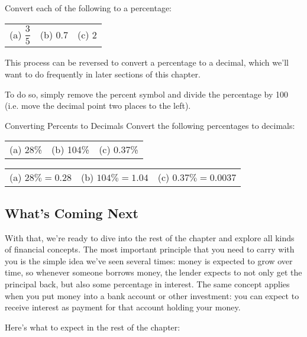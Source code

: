 \begin{try}
Convert each of the following to a percentage:\\

\begin{tabular}{l l l}
(a) $\dfrac{3}{5}$ & (b) $0.7$ & (c) 2
\end{tabular}
\end{try}

This process can be reversed to convert a percentage to a decimal, which we'll want to do frequently in later sections of this chapter.

To do so, simply remove the percent symbol and divide the percentage by 100 (i.e. move the decimal point two places to the left).

\begin{example}[https://www.youtube.com/watch?v=d770dB9RHIc&list=PLfmpjsIzhztsZtnb7HnXrQ8SLoiOCIcAM&index=2]{Converting Percents to Decimals}
Convert the following percentages to decimals:\\

\begin{tabular}{l l l}
(a) 28\% & (b) 104\% & (c) 0.37\%
\end{tabular}

\sol
\begin{center}
\begin{tabular}{l l l}
(a) $28\% = 0.28$ & (b) $104\% = 1.04$ & (c) $0.37\% = 0.0037$
\end{tabular}
\end{center}
\end{example}
\pagebreak

\subsection{What's Coming Next}
With that, we're ready to dive into the rest of the chapter and explore all kinds of financial concepts.  The most important principle that you need to carry with you is the simple idea we've seen several times: money is expected to grow over time, so whenever someone borrows money, the lender expects to not only get the principal back, but also some percentage in interest.  The same concept applies when you put money into a bank account or other investment: you can expect to receive interest as payment for that account holding your money.

Here's what to expect in the rest of the chapter:
